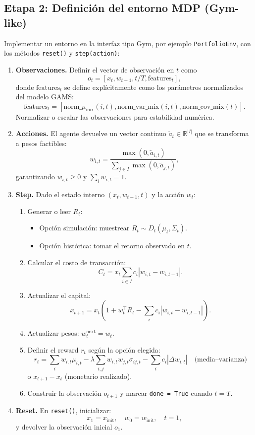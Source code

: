 \documentclass[12pt]{article}
\begin{document}
\subsection{Etapa 2: Definición del entorno MDP (Gym-like)}
Implementar un entorno en la interfaz tipo Gym, por ejemplo \texttt{PortfolioEnv}, con los métodos \texttt{reset()} y \texttt{step(action)}:
\begin{enumerate}
    \item \textbf{Observaciones.} Definir el vector de observación en $t$ como
    $$o_t = \left[ x_t, w_{t-1}, t/T, \text{features}_t \right],$$
    donde $\text{features}_t$ se define explícitamente como los parámetros normalizados del modelo GAMS:
    $$\text{features}_t = \left[ \text{norm\_}\mu_{\text{mix}}(i,t), \text{norm\_var\_mix}(i,t), \text{norm\_cov\_mix}(t) \right].$$
    Normalizar o escalar las observaciones para estabilidad numérica.
    \item \textbf{Acciones.} El agente devuelve un vector continuo $\tilde{a}_t \in \mathbb{R}^{|I|}$ que se transforma a pesos factibles:
    $$w_{i,t} = \frac{\max(0, \tilde{a}_{i,t})}{\sum_{j \in I} \max(0, \tilde{a}_{j,t})},$$
    garantizando $w_{i,t} \geq 0$ y $\sum_i w_{i,t} = 1$.
    \item \textbf{Step.} Dado el estado interno $(x_t, w_{t-1}, t)$ y la acción $w_t$:
    \begin{enumerate}
        \item[(a)] Generar o leer $R_t$:
        \begin{itemize}
            \item Opción simulación: muestrear $R_t \sim D_t(\mu_t, \Sigma_t)$.
            \item Opción histórica: tomar el retorno observado en $t$.
        \end{itemize}
        \item[(b)] Calcular el costo de transacción:
        $$C_t = x_t \sum_{i \in I} c_i |w_{i,t} - w_{i,t-1}|.$$
        \item[(c)] Actualizar el capital:
        $$x_{t+1} = x_t \left(1 + w_t^\top R_t - \sum_i c_i |w_{i,t} - w_{i,t-1}|\right).$$
        \item[(d)] Actualizar pesos: $w^{\text{next}}_t = w_t$.
        \item[(e)] Definir el reward $r_t$ según la opción elegida:
        $$r_t = \sum_i w_{i,t} \mu_{i,t} - \lambda \sum_{i,j} w_{i,t} w_{j,t} \sigma_{ij,t} - \sum_i c_i |\Delta w_{i,t}| \quad \text{(media--varianza)}$$
        o $x_{t+1} - x_t$ (monetario realizado).
        \item[(f)] Construir la observación $o_{t+1}$ y marcar \texttt{done = True} cuando $t = T$.
    \end{enumerate}
    \item \textbf{Reset.} En \texttt{reset()}, inicializar:
    $$x_1 = x_{\text{init}}, \quad w_0 = w_{\text{init}}, \quad t = 1,$$
    y devolver la observación inicial $o_1$.
\end{enumerate}
\end{document}
